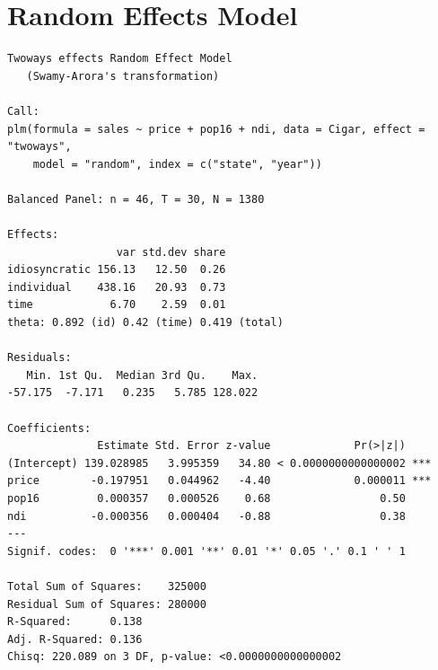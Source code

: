 \documentclass[]{book}
\newenvironment{Shaded}{\begin{snugshade}}{\end{snugshade}}
\newcommand{\DataTypeTok}[1]{\textcolor[rgb]{0.13,0.29,0.53}{#1}}
\newcommand{\KeywordTok}[1]{\textcolor[rgb]{0.13,0.29,0.53}{\textbf{#1}}}
\newcommand{\NormalTok}[1]{#1}
\newcommand{\OperatorTok}[1]{\textcolor[rgb]{0.81,0.36,0.00}{\textbf{#1}}}
\newcommand{\StringTok}[1]{\textcolor[rgb]{0.31,0.60,0.02}{#1}}
\begin{document}
\hypertarget{random-effects-model}{%
\section{Random Effects Model}\label{random-effects-model}}

\begin{Shaded}
\end{Shaded}

\begin{verbatim}
Twoways effects Random Effect Model 
   (Swamy-Arora's transformation)

Call:
plm(formula = sales ~ price + pop16 + ndi, data = Cigar, effect = "twoways", 
    model = "random", index = c("state", "year"))

Balanced Panel: n = 46, T = 30, N = 1380

Effects:
                 var std.dev share
idiosyncratic 156.13   12.50  0.26
individual    438.16   20.93  0.73
time            6.70    2.59  0.01
theta: 0.892 (id) 0.42 (time) 0.419 (total)

Residuals:
   Min. 1st Qu.  Median 3rd Qu.    Max. 
-57.175  -7.171   0.235   5.785 128.022 

Coefficients:
              Estimate Std. Error z-value             Pr(>|z|)    
(Intercept) 139.028985   3.995359   34.80 < 0.0000000000000002 ***
price        -0.197951   0.044962   -4.40             0.000011 ***
pop16         0.000357   0.000526    0.68                 0.50    
ndi          -0.000356   0.000404   -0.88                 0.38    
---
Signif. codes:  0 '***' 0.001 '**' 0.01 '*' 0.05 '.' 0.1 ' ' 1

Total Sum of Squares:    325000
Residual Sum of Squares: 280000
R-Squared:      0.138
Adj. R-Squared: 0.136
Chisq: 220.089 on 3 DF, p-value: <0.0000000000000002
\end{verbatim}


\end{document}
